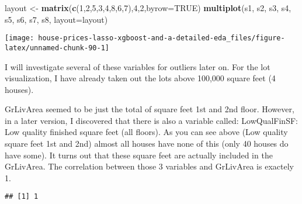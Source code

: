 \documentclass[]{article}
\newenvironment{Shaded}{\begin{snugshade}}{\end{snugshade}}
\newcommand{\DataTypeTok}[1]{\textcolor[rgb]{0.13,0.29,0.53}{#1}}
\newcommand{\DecValTok}[1]{\textcolor[rgb]{0.00,0.00,0.81}{#1}}
\newcommand{\KeywordTok}[1]{\textcolor[rgb]{0.13,0.29,0.53}{\textbf{#1}}}
\newcommand{\NormalTok}[1]{#1}
\newcommand{\OperatorTok}[1]{\textcolor[rgb]{0.81,0.36,0.00}{\textbf{#1}}}
\newcommand{\OtherTok}[1]{\textcolor[rgb]{0.56,0.35,0.01}{#1}}
\newcommand{\StringTok}[1]{\textcolor[rgb]{0.31,0.60,0.02}{#1}}
\begin{document}
\begin{Shaded}
\begin{Highlighting}[]
\NormalTok{layout <-}\StringTok{ }\KeywordTok{matrix}\NormalTok{(}\KeywordTok{c}\NormalTok{(}\DecValTok{1}\NormalTok{,}\DecValTok{2}\NormalTok{,}\DecValTok{5}\NormalTok{,}\DecValTok{3}\NormalTok{,}\DecValTok{4}\NormalTok{,}\DecValTok{8}\NormalTok{,}\DecValTok{6}\NormalTok{,}\DecValTok{7}\NormalTok{),}\DecValTok{4}\NormalTok{,}\DecValTok{2}\NormalTok{,}\DataTypeTok{byrow=}\OtherTok{TRUE}\NormalTok{)}
\KeywordTok{multiplot}\NormalTok{(s1, s2, s3, s4, s5, s6, s7, s8, }\DataTypeTok{layout=}\NormalTok{layout)}
\end{Highlighting}
\end{Shaded}

\texttt{[image: house-prices-lasso-xgboost-and-a-detailed-eda\_files/figure-latex/unnamed-chunk-90-1]}

I will investigate several of these variables for outliers later on. For
the lot visualization, I have already taken out the lots above 100,000
square feet (4 houses).

GrLivArea seemed to be just the total of square feet 1st and 2nd floor.
However, in a later version, I discovered that there is also a variable
called: LowQualFinSF: Low quality finished square feet (all floors). As
you can see above (Low quality square feet 1st and 2nd) almost all
houses have none of this (only 40 houses do have some). It turns out
that these square feet are actually included in the GrLivArea. The
correlation between those 3 variables and GrLivArea is exactely 1.

\begin{Shaded}
\end{Shaded}

\begin{verbatim}
## [1] 1
\end{verbatim}

\begin{Shaded}
\end{Shaded}
\end{document}
